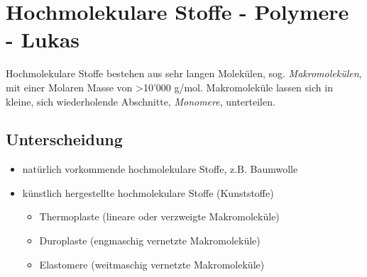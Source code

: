 \section{Hochmolekulare Stoffe - Polymere - Lukas}
Hochmolekulare Stoffe bestehen aus sehr langen Molekülen, sog. \emph{Makromolekülen}, mit einer Molaren Masse von >10'000 g/mol. Makromoleküle lassen sich in kleine, sich wiederholende Abschnitte, \emph{Monomere}, unterteilen. \\

\subsection{Unterscheidung}
\begin{itemize}
	\item natürlich vorkommende hochmolekulare Stoffe, z.B. Baumwolle
	\item künstlich hergestellte hochmolekulare Stoffe (Kunststoffe)
		\begin{itemize}
			\item Thermoplaste (lineare oder verzweigte Makromoleküle)
			\item Duroplaste (engmaschig vernetzte Makromoleküle)
			\item Elastomere (weitmaschig vernetzte Makromoleküle)
		\end{itemize}
\end{itemize}

